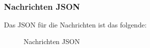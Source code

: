 \subsubsection{Nachrichten JSON}
Das JSON für die Nachrichten ist das folgende:
\begin{figure}[H]
	\centering
	
	\caption{Nachrichten JSON}
\end{figure}



